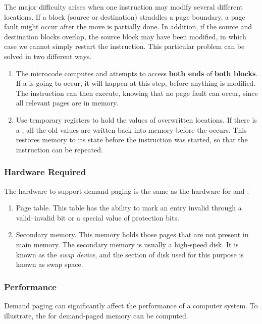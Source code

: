 The major difficulty arises when one instruction may modify several different locations.
If a block (source or destination) straddles a page boundary, a page fault might occur after the move is partially done.
In addition, if the source and destination blocks overlap, the source block may have been modified, in which case we cannot simply restart the instruction.
This particular problem can be solved in two different ways.
\begin{enumerate}[noitemsep]
\item The microcode computes and attempts to access \textbf{both ends} of \textbf{both blocks}.
  If a  is going to occur, it will happen at this step, before anything is modified.
  The instruction can then execute, knowing that no page fault can occur, since all relevant pages are in memory.
\item Use temporary registers to hold the values of overwritten locations.
  If there is a , all the old values are written back into memory before the  occurs.
  This restores memory to its state before the instruction was started, so that the instruction can be repeated.
\end{enumerate}

\subsubsection{Hardware Required}\label{subsubsec:Demand_Paging_Required_Hardware}
The hardware to support demand paging is the same as the hardware for  and :
\begin{enumerate}[noitemsep]
\item Page table.
  This table has the ability to mark an entry invalid through a valid–invalid bit or a special value of protection bits.
\item Secondary memory.
  This memory holds those pages that are not present in main memory.
  The secondary memory is usually a high-speed disk.
  It is known as the \emph{swap device}, and the section of disk used for this purpose is known as swap space.
\end{enumerate}

\subsubsection{Performance}\label{subsubsec:Demand_Paging_Performance}
Demand paging can significantly affect the performance of a computer system.
To illustrate, the  for demand-paged memory can be computed.

